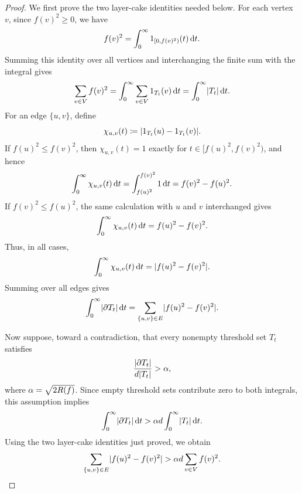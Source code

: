\begin{proof}
	We first prove the two layer-cake identities needed below. For each vertex \(v\), since \(f(v)^2\geq 0\), we have
	\begin{equation}
		f(v)^2=\int_0^\infty \mathbf{1}_{[0,f(v)^2)}(t)\odif{t}.
	\end{equation}
	Summing this identity over all vertices and interchanging the finite sum with the integral gives
	\begin{equation}
		\sum_{v\in \Vertices}f(v)^2
		=
		\int_0^\infty \sum_{v\in \Vertices}\mathbf{1}_{T_t}(v)\odif{t}
		=
		\int_0^\infty \abs{T_t}\odif{t}.
	\end{equation}
	For an edge \(\{u,v\}\), define
	\begin{equation}
		\chi_{u,v}(t)\coloneqq \lvert1_{T_t}(u)-1_{T_t}(v)\rvert.
	\end{equation}
	If \(f(u)^2\leq f(v)^2\), then \(\chi_{u,v}(t)=1\) exactly for \(t\in[f(u)^2,f(v)^2)\), and hence
	\begin{equation}
		\int_0^\infty \chi_{u,v}(t)\odif{t}
		=
		\int_{f(u)^2}^{f(v)^2}1\odif{t}
		=
		f(v)^2-f(u)^2.
	\end{equation}
	If \(f(v)^2\leq f(u)^2\), the same calculation with \(u\) and \(v\) interchanged gives
	\begin{equation}
		\int_0^\infty \chi_{u,v}(t)\odif{t}
		=
		f(u)^2-f(v)^2.
	\end{equation}
	Thus, in all cases,
	\begin{equation}
		\int_0^\infty \chi_{u,v}(t)\odif{t}=\abs{f(u)^2-f(v)^2}.
	\end{equation}
	Summing over all edges gives
	\begin{equation}
		\int_0^\infty \abs{\partial T_t}\odif{t}
		=
		\sum_{\{u,v\}\in\Edges}\abs{f(u)^2-f(v)^2}.
	\end{equation}

	Now suppose, toward a contradiction, that every nonempty threshold set \(T_t\) satisfies
	\begin{equation}
		\frac{\lvert\partial T_t\rvert}{d\lvert T_t\rvert}>\alpha,
	\end{equation}
	where \(\alpha=\sqrt{2R(f)}\). Since empty threshold sets contribute zero to both integrals, this assumption implies
	\begin{equation}
		\int_0^\infty \abs{\partial T_t}\odif{t}
		>
		\alpha d\int_0^\infty \abs{T_t}\odif{t}.
	\end{equation}
	Using the two layer-cake identities just proved, we obtain
	\begin{equation}
		\sum_{\{u,v\}\in E}\lvert f(u)^2-f(v)^2\rvert
		>
		\alpha d\sum_{v\in V}f(v)^2.
	\end{equation}


\end{proof}
